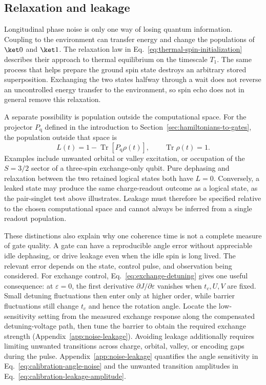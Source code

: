 \subsection{Relaxation and leakage}

Longitudinal phase noise is only one way of losing quantum
information. Coupling to the environment can transfer energy and
change the populations of $\ket0$ and $\ket1$. The relaxation law
in Eq.~\eqref{eq:thermal-spin-initialization} describes their
approach to thermal equilibrium on the timescale $T_1$. The same
process that helps prepare the ground spin state destroys an
arbitrary stored superposition. Exchanging the two states halfway
through a wait does not reverse an uncontrolled energy transfer
to the environment, so spin echo does not in general remove this
relaxation.

A separate possibility is population outside the computational
space. For the projector $P_{\mathrm q}$ defined in the introduction
to Section~\ref{sec:hamiltonians-to-gates}, the population outside
that space is
\begin{equation}
 L(t)=1-\operatorname{Tr}[P_{\mathrm q}\rho(t)],
 \qquad \operatorname{Tr}\rho(t)=1.
 \label{eq:platform-leakage-population}
\end{equation}
Examples include unwanted orbital or valley excitation, or
occupation of the $S=3/2$ sector of a three-spin exchange-only
qubit. Pure dephasing and relaxation between the two retained
logical states both have $L=0$. Conversely, a leaked state may
produce the same charge-readout outcome as a logical state, as the
pair-singlet test above illustrates. Leakage must therefore be
specified relative to the chosen computational space and cannot
always be inferred from a single readout population.

These distinctions also explain why one coherence time is not a
complete measure of gate quality. A gate can have a reproducible
angle error without appreciable idle dephasing, or drive leakage
even when the idle spin is long lived. The relevant error depends
on the state, control pulse, and observation being considered.
For exchange control, Eq.~\eqref{eq:exchange-detuning} gives one
useful consequence: at $\varepsilon=0$, the first derivative
$\partial J/\partial\varepsilon$ vanishes when $t_c,U,V$ are fixed.
Small detuning fluctuations then enter only at higher order, while
barrier fluctuations still change $t_c$ and hence the rotation angle.
Locate the low-sensitivity setting from the measured exchange
response along the compensated detuning-voltage path, then tune
the barrier to obtain the required exchange strength
(Appendix~\ref{app:noise-leakage}).
Avoiding leakage additionally requires limiting unwanted transitions
across charge, orbital, valley, or encoding gaps during the pulse.
Appendix~\ref{app:noise-leakage} quantifies the angle sensitivity in
Eq.~\eqref{eq:calibration-angle-noise} and the unwanted transition
amplitudes in Eq.~\eqref{eq:calibration-leakage-amplitude}.

